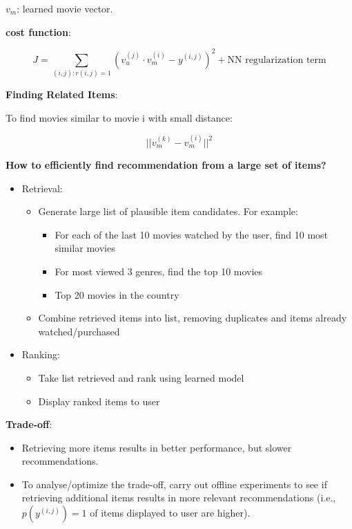 \documentclass{article}
\begin{document}
\noindent \(v_{m}\): learned movie vector.

\bigskip

\noindent \textbf{cost function}:

\[J = \sum_{(i, j):r(i, j)=1} (v_{u}^{(j)} \cdot v_{m}^{(i)} - y^{(i, j)})^2 + \text{NN regularization term}\]

\noindent \textbf{Finding Related Items}:

\noindent To find movies similar to movie i with small distance:

\[\vert\vert v_{m}^{(k)} - v_{m}^{(i)} \vert\vert^2\]

\noindent \textbf{How to efficiently find recommendation from
a large set of items?}

\begin{itemize}
    \item Retrieval:
    \begin{itemize}
        \item Generate large list of plausible item candidates. For example:
        \begin{itemize}
            \item For each of the last 10 movies watched by the user, find 10 most similar movies
            \item For most viewed 3 genres, find the top 10 movies
            \item Top 20 movies in the country
        \end{itemize}
        \item Combine retrieved items into list, removing duplicates and items already watched/purchased
    \end{itemize}
    \item Ranking:
    \begin{itemize}
        \item Take list retrieved and rank using learned model 
        \item Display ranked items to user
    \end{itemize}
\end{itemize}

\noindent \textbf{Trade-off}:

\begin{itemize}
    \item Retrieving more items results in better performance, but slower recommendations.
    \item To analyse/optimize the trade-off, carry out offline experiments to see if retrieving additional items results in more relevant recommendations (i.e., \(p(y^{(i, j)}) = 1\) of items displayed to user are higher).
\end{itemize}
\end{document}
